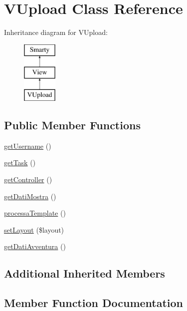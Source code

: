 \hypertarget{class_v_upload}{}\section{V\+Upload Class Reference}
\label{class_v_upload}
Inheritance diagram for V\+Upload\+:\begin{figure}[H]
\begin{center}
\leavevmode
\includegraphics[height=3.000000cm]{class_v_upload}
\end{center}
\end{figure}
\subsection*{Public Member Functions}
\begin{DoxyCompactItemize}
\item 
\mbox{\hyperlink{class_v_upload_a40eda7e5af26d0734065a870d1e64bbd}{get\+Username}} ()
\item 
\mbox{\hyperlink{class_v_upload_a56b4c2fa5878156be19ff557b2bf1391}{get\+Task}} ()
\item 
\mbox{\hyperlink{class_v_upload_a28f50c4adb85c410912a6f66e868c814}{get\+Controller}} ()
\item 
\mbox{\hyperlink{class_v_upload_a2e28d01ebb2b23c71a8f91ed94c56bd4}{get\+Dati\+Mostra}} ()
\item 
\mbox{\hyperlink{class_v_upload_ae2eeab5d6f78aecd348c20f9e296b339}{processa\+Template}} ()
\item 
\mbox{\hyperlink{class_v_upload_a5dec9f21c01d72a23db2d8198994f705}{set\+Layout}} (\$layout)
\item 
\mbox{\hyperlink{class_v_upload_a749ab9044ba53189edc5cd96c6913942}{get\+Dati\+Avventura}} ()
\end{DoxyCompactItemize}
\subsection*{Additional Inherited Members}


\subsection{Member Function Documentation}
\mbox{\label{class_v_upload_a28f50c4adb85c410912a6f66e868c814}} 
